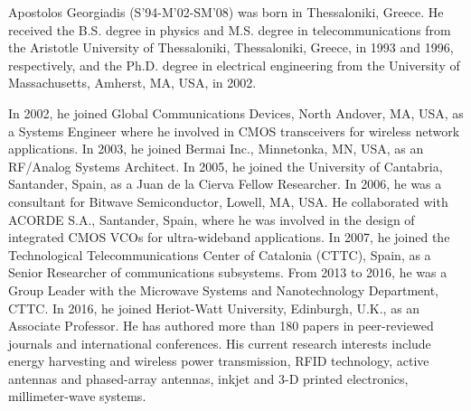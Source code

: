 \documentclass[journal]{IEEEtran}
\begin{document}
\begin{IEEEbiography}
{Apostolos Georgiadis} (S'94-M'02-SM'08) was
born in Thessaloniki, Greece. He received the B.S.
degree in physics and M.S. degree in telecommunications
from the Aristotle University of Thessaloniki,
Thessaloniki, Greece, in 1993 and 1996,
respectively, and the Ph.D. degree in electrical
engineering from the University of Massachusetts,
Amherst, MA, USA, in 2002.

In 2002, he joined Global Communications
Devices, North Andover, MA, USA, as a Systems
Engineer where he involved in CMOS transceivers
for wireless network applications. In 2003, he joined Bermai Inc., Minnetonka,
MN, USA, as an RF/Analog Systems Architect. In 2005, he joined the
University of Cantabria, Santander, Spain, as a Juan de la Cierva Fellow
Researcher. In 2006, he was a consultant for Bitwave Semiconductor, Lowell,
MA, USA. He collaborated with ACORDE S.A., Santander, Spain, where
he was involved in the design of integrated CMOS VCOs for ultra-wideband
applications. In 2007, he joined the Technological Telecommunications Center
of Catalonia (CTTC), Spain, as a Senior Researcher of communications
subsystems. From 2013 to 2016, he was a Group Leader with the Microwave
Systems and Nanotechnology Department, CTTC. In 2016, he joined Heriot-Watt University, Edinburgh, U.K., as an Associate Professor. He has authored
more than 180 papers in peer-reviewed journals and international conferences.
His current research interests include energy harvesting and wireless power
transmission, RFID technology, active antennas and phased-array antennas,
inkjet and 3-D printed electronics, millimeter-wave systems.


\end{IEEEbiography}
\end{document}
